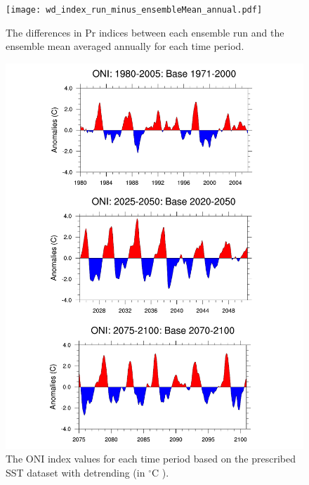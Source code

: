 \documentclass{ametsoc}
\begin{document}
\clearpage
 
\begin{figure}
\begin{center}
\texttt{[image: wd\_index\_run\_minus\_ensembleMean\_annual.pdf]}
\caption{The differences in Pr indices between each ensemble run and the ensemble mean averaged annually for each time period.}
\label{fig:S1}
\end{center}
\end{figure}
%
\begin{figure}
\begin{center}
\includegraphics[width=6in]{indices_oni.pdf}
\caption{The ONI index values for each time period based on the prescribed SST dataset with detrending (in $^\circ$C ).}
\end{center}
\label{fig:S2}
\end{figure}
\end{document}
